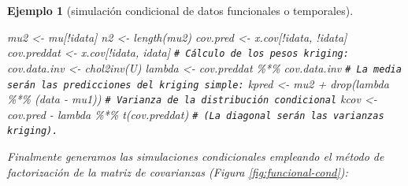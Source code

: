 \documentclass[
]{book}
\newenvironment{Shaded}{\begin{snugshade}}{\end{snugshade}}
\newcommand{\CommentTok}[1]{\textcolor[rgb]{0.56,0.35,0.01}{\textit{#1}}}
\newcommand{\FunctionTok}[1]{\textcolor[rgb]{0.00,0.00,0.00}{#1}}
\newcommand{\NormalTok}[1]{#1}
\newcommand{\OtherTok}[1]{\textcolor[rgb]{0.56,0.35,0.01}{#1}}
\newcommand{\SpecialCharTok}[1]{\textcolor[rgb]{0.00,0.00,0.00}{#1}}
\theoremstyle{break}
\newtheorem{example}{Ejemplo}[chapter]
\theoremstyle{nonumberplain}
\renewcommand{\CommentTok}[1]{\textcolor[rgb]{0.41,0.41,0.41}{\texttt{#1}}}
\begin{document}
\begin{example}[simulación condicional de datos funcionales o temporales]
\begin{Shaded}
\begin{Highlighting}[]
\NormalTok{mu2 }\OtherTok{\textless{}{-}}\NormalTok{ mu[}\SpecialCharTok{!}\NormalTok{idata]}
\NormalTok{n2 }\OtherTok{\textless{}{-}} \FunctionTok{length}\NormalTok{(mu2)}
\NormalTok{cov.pred }\OtherTok{\textless{}{-}}\NormalTok{ x.cov[}\SpecialCharTok{!}\NormalTok{idata, }\SpecialCharTok{!}\NormalTok{idata]}
\NormalTok{cov.preddat }\OtherTok{\textless{}{-}}\NormalTok{ x.cov[}\SpecialCharTok{!}\NormalTok{idata, idata]}
\CommentTok{\# Cálculo de los pesos kriging:}
\NormalTok{cov.data.inv }\OtherTok{\textless{}{-}} \FunctionTok{chol2inv}\NormalTok{(U)}
\NormalTok{lambda }\OtherTok{\textless{}{-}}\NormalTok{ cov.preddat }\SpecialCharTok{\%*\%}\NormalTok{ cov.data.inv}
\CommentTok{\# La media serán las predicciones del kriging simple:}
\NormalTok{kpred }\OtherTok{\textless{}{-}}\NormalTok{ mu2 }\SpecialCharTok{+} \FunctionTok{drop}\NormalTok{(lambda }\SpecialCharTok{\%*\%}\NormalTok{ (data }\SpecialCharTok{{-}}\NormalTok{ mu1))}
\CommentTok{\# Varianza de la distribución condicional}
\NormalTok{kcov }\OtherTok{\textless{}{-}}\NormalTok{ cov.pred }\SpecialCharTok{{-}}\NormalTok{  lambda }\SpecialCharTok{\%*\%} \FunctionTok{t}\NormalTok{(cov.preddat)}
\CommentTok{\# (La diagonal serán las varianzas kriging). }
\end{Highlighting}
\end{Shaded}

Finalmente generamos las simulaciones condicionales empleando el método de factorización de la matriz de covarianzas (Figura \ref{fig:funcional-cond}):




\end{example}
\end{document}
